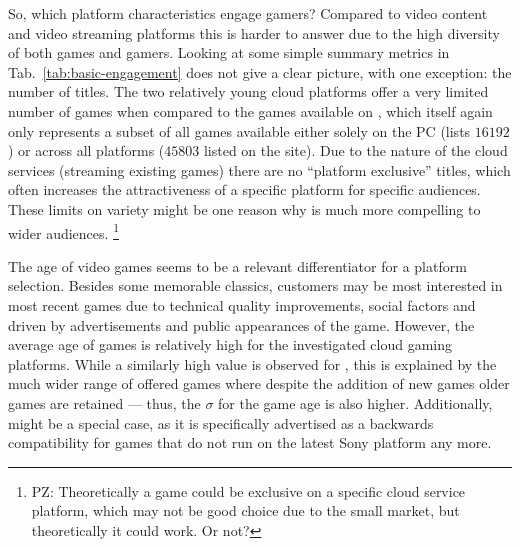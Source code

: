 So, which platform characteristics engage gamers? Compared to video content and video streaming platforms this is harder to answer due to the high diversity of both games and  gamers. Looking at some simple summary metrics in Tab.~\ref{tab:basic-engagement} does not give a clear picture, with one exception: the number of titles. The two relatively young cloud platforms offer a very limited number of games when compared to the games available on \steam, which itself again only represents a subset of all games available either solely on the PC (\metacritic lists $16192$) or across all platforms ($45803$ listed on the site). Due to the nature of the cloud services (streaming existing games) there are no ``platform exclusive'' titles, which often increases the attractiveness of a specific platform for specific audiences. These limits on variety might be one reason why \steam is much more compelling to wider audiences.
\footnote{PZ: Theoretically a game could be exclusive on a specific cloud service platform, which may not be good choice due to the small market, but theoretically it could work. Or not?}

The age of video games seems to be a relevant differentiator for a platform selection. Besides some memorable classics, customers may be most interested in most recent games due to technical quality improvements, social factors  and driven by advertisements and public appearances of the game. However, the average age of games is relatively high for the investigated cloud gaming platforms. While a similarly high value is observed for \steam, this is explained by the much wider range of offered games where despite the addition of new games older games are retained --- thus, the $\sigma$ for the game age is also higher. Additionally, \psnow might be a special case, as it is specifically advertised as a backwards compatibility for games that do not run on the latest Sony platform any more.%



 
